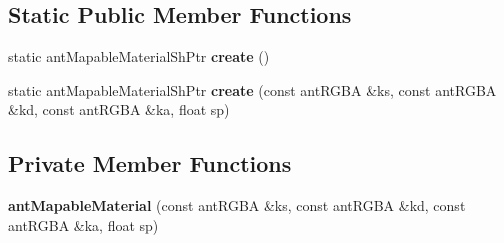 \subsection*{Static Public Member Functions}
\begin{DoxyCompactItemize}
\item 
\hypertarget{classant_mapable_material_ac89990b6cd6ccb843ba6512c429c24a3}{static ant\+Mapable\+Material\+Sh\+Ptr {\bfseries create} ()}\label{classant_mapable_material_ac89990b6cd6ccb843ba6512c429c24a3}

\item 
\hypertarget{classant_mapable_material_af4d9377790a1250797198d2566bbc597}{static ant\+Mapable\+Material\+Sh\+Ptr {\bfseries create} (const ant\+R\+G\+B\+A \&ks, const ant\+R\+G\+B\+A \&kd, const ant\+R\+G\+B\+A \&ka, float sp)}\label{classant_mapable_material_af4d9377790a1250797198d2566bbc597}

\end{DoxyCompactItemize}
\subsection*{Private Member Functions}
\begin{DoxyCompactItemize}
\item 
\hypertarget{classant_mapable_material_a53dbb1db3b4ad816752b97a4053935d9}{{\bfseries ant\+Mapable\+Material} (const ant\+R\+G\+B\+A \&ks, const ant\+R\+G\+B\+A \&kd, const ant\+R\+G\+B\+A \&ka, float sp)}\label{classant_mapable_material_a53dbb1db3b4ad816752b97a4053935d9}

\end{DoxyCompactItemize}

